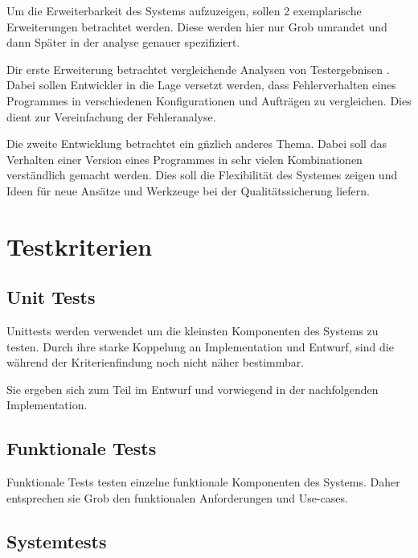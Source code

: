 Um die Erweiterbarkeit des Systems aufzuzeigen,
sollen 2 exemplarische Erweiterungen betrachtet werden.
Diese werden hier nur Grob umrandet und dann Sp\"ater in der analyse genauer spezifiziert.

Dir erste Erweiterung betrachtet vergleichende Analysen von Testergebnisen .
Dabei sollen Entwickler in die Lage versetzt werden,
dass Fehlerverhalten eines Programmes in verschiedenen Konfigurationen und Auftr\"agen zu vergleichen.
Dies dient zur Vereinfachung der Fehleranalyse.

Die zweite Entwicklung betrachtet ein g\"nzlich anderes Thema.
Dabei soll das Verhalten einer Version eines Programmes
in sehr vielen Kombinationen verst\"andlich gemacht werden.
Dies soll die Flexibilit\"at des Systemes zeigen und
Ideen f\"ur neue Ans\"atze und Werkzeuge bei der Qualit\"atssicherung liefern.





\section{Testkriterien}
\subsection{Unit Tests}

Unittests werden verwendet um die kleinsten Komponenten des Systems zu testen.
Durch ihre starke Koppelung an Implementation und Entwurf,
sind die w\"ahrend der Kriterienfindung noch nicht n\"aher bestimmbar.

Sie ergeben sich zum Teil im Entwurf und vorwiegend in
der nachfolgenden Implementation.

\subsection{Funktionale Tests}

Funktionale Tests testen einzelne funktionale Komponenten des Systems.
Daher entsprechen sie Grob den funktionalen Anforderungen und Use-cases.

\subsection{Systemtests}

